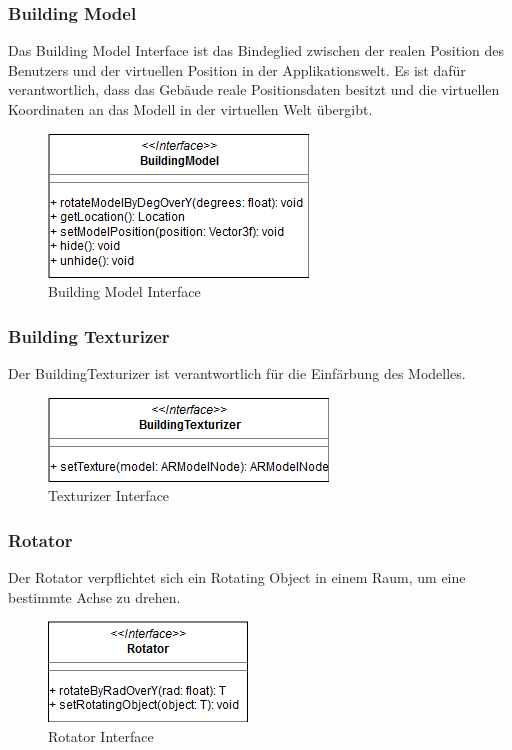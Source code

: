 \documentclass[a4paper]{scrreprt}
\begin{document}
\clearpage
\subsubsection{Building Model}
Das Building Model Interface ist das Bindeglied zwischen der realen Position des Benutzers und der virtuellen Position in der Applikationswelt. Es ist dafür verantwortlich, dass das Gebäude reale Positionsdaten besitzt und die virtuellen Koordinaten an das Modell in der virtuellen Welt übergibt.

\begin{figure}[h!]
	\center
	\includegraphics[scale=0.75]{BuildingModel.png}
	\caption{Building Model Interface}
\end{figure}

\subsubsection{Building Texturizer}
Der BuildingTexturizer ist verantwortlich für die Einfärbung des Modelles.
\begin{figure}[h!]
	\center
	\includegraphics[scale=0.75]{BuildingTexturizer.png}
	\caption{Texturizer Interface}
\end{figure}


\subsubsection{Rotator}
Der Rotator verpflichtet sich ein Rotating Object in einem Raum, um eine bestimmte Achse zu drehen.
\begin{figure}[h!]
	\center
	\includegraphics[scale=0.75]{Rotator.png}
	\caption{Rotator Interface}
\end{figure}
\end{document}

